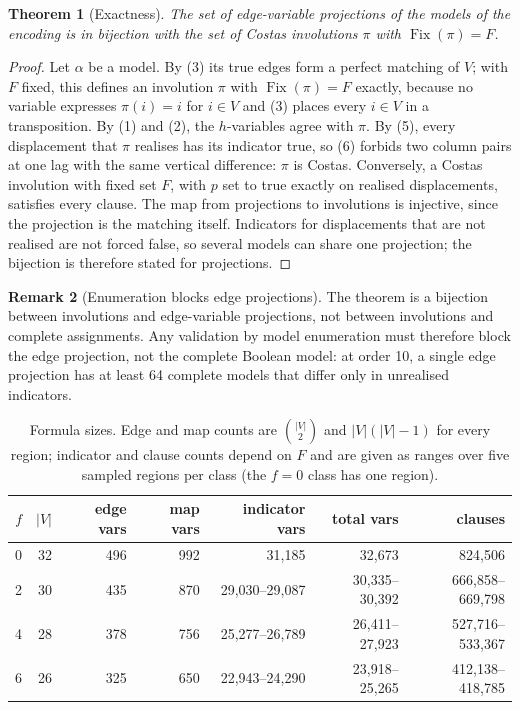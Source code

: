 \documentclass[11pt,a4paper,oneside]{report}
\newtheorem{theorem}{Theorem}[chapter]
\theoremstyle{definition}
\newtheorem{remark}[theorem]{Remark}
\newcommand{\Fix}{\operatorname{Fix}}
\begin{document}
\begin{theorem}[Exactness]\label{p8-thm:exact}
The set of edge-variable projections of the models of the encoding is in bijection with the
set of Costas involutions $\pi$ with $\Fix(\pi)=F$.
\end{theorem}
\begin{proof}
Let $\alpha$ be a model. By (3) its true edges form a perfect matching of $V$; with $F$ fixed,
this defines an involution $\pi$ with $\Fix(\pi)=F$ exactly, because no variable expresses
$\pi(i)=i$ for $i\in V$ and (3) places every $i\in V$ in a transposition. By (1) and (2), the
$h$-variables agree with $\pi$. By (5), every displacement that $\pi$ realises has its
indicator true, so (6) forbids two column pairs at one lag with the same vertical difference:
$\pi$ is Costas. Conversely, a Costas involution with fixed set $F$, with $p$ set to true
exactly on realised displacements, satisfies every clause. The map from projections to
involutions is injective, since the projection is the matching itself. Indicators for
displacements that are not realised are not forced false, so several models can share one
projection; the bijection is therefore stated for projections.
\end{proof}

\begin{remark}[Enumeration blocks edge projections]\label{p8-rem:projblock}
The theorem is a bijection between involutions and edge-variable projections, not between
involutions and complete assignments. Any validation by model enumeration must therefore block the
edge projection, not the complete Boolean model: at order 10, a single edge projection has at least
64 complete models that differ only in unrealised indicators.
\end{remark}

\begin{table}[H]
\centering
\begin{tabular}{@{}rrrrrrr@{}}
\toprule
$f$ & $|V|$ & edge vars & map vars & indicator vars & total vars & clauses \\
\midrule
0 & 32 & 496 & 992 & 31{,}185 & 32{,}673 & 824{,}506 \\
2 & 30 & 435 & 870 & 29{,}030--29{,}087 & 30{,}335--30{,}392 & 666{,}858--669{,}798 \\
4 & 28 & 378 & 756 & 25{,}277--26{,}789 & 26{,}411--27{,}923 & 527{,}716--533{,}367 \\
6 & 26 & 325 & 650 & 22{,}943--24{,}290 & 23{,}918--25{,}265 & 412{,}138--418{,}785 \\
\bottomrule
\end{tabular}
\caption{Formula sizes. Edge and map counts are $\binom{|V|}{2}$ and $|V|(|V|-1)$ for every
region; indicator and clause counts depend on $F$ and are given as ranges over five sampled
regions per class (the $f=0$ class has one region).}
\label{p8-tab:sizes}
\end{table}
\end{document}
